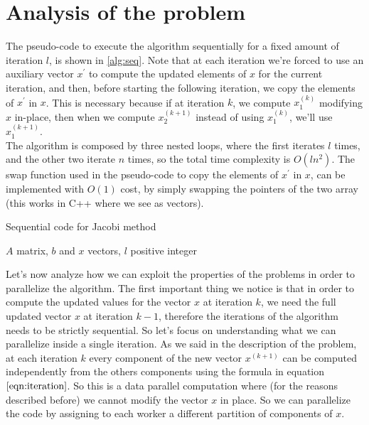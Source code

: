 \documentclass{article}
\begin{document}
	\section{Analysis of the problem}
	The pseudo-code to execute the algorithm sequentially for a fixed amount of iteration $l$, is shown in \ref{alg:seq}. Note that at each iteration we're forced to use an auxiliary vector $x^\prime$ to compute the updated elements of $x$ for the current iteration, and then, before starting the following iteration, we copy the elements of $x^\prime$ in $x$. This is necessary because if at iteration $k$, we compute $x^{(k)}_1$ modifying $x$ in-place, then when we compute $x^{(k+1)}_2$ instead of using $x^{(k)}_1$, we'll use $x^{(k+1)}_1$.\\ The algorithm is composed by three nested loops, where the first iterates $l$ times, and the other two iterate $n$ times, so the total time complexity is $O(ln^2)$. The swap function used in the pseudo-code to copy the elements of $x^\prime$ in $x$, can be implemented with $O(1)$ cost, by simply swapping the pointers of the two array (this works in C++ where we see as vectors).
	\begin{algorithm}[H]
		\caption{Sequential code for Jacobi method}\label{alg:seq}
		\begin{algorithmic}[1]
			\Require $A$ matrix, $b$ and $x$ vectors, $l$ positive integer
			\EndIf
			\EndFor
			\EndFor
			\EndFor
		\end{algorithmic}
	\end{algorithm}
	Let's now analyze how we can exploit the properties of the problems in order to parallelize the algorithm. The first important thing we notice is that in order to compute the updated values for the vector $x$ at iteration $k$, we need the full updated vector $x$ at iteration $k-1$, therefore the iterations of the algorithm needs to be strictly sequential. So let's focus on understanding what we can parallelize inside a single iteration. As we said in the description of the problem, at each iteration $k$ every component of the new vector $x^{(k+1)}$ can be computed independently from the others components using the formula in equation $\ref{eqn:iteration}$. So this is a data parallel computation where (for the reasons described before) we cannot modify the vector $x$ in place. So we can parallelize the code by assigning to each worker a different partition of components of $x$. \\
\end{document}
